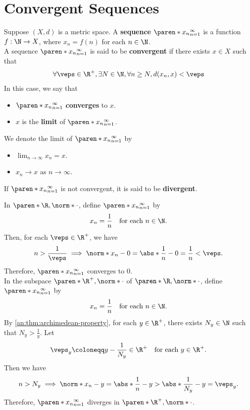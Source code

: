 \section{Convergent Sequences}

\begin{definition} \label{an:def:sequence-convergence}
  Suppose $(X, d)$ is a metric space. A \textbf{sequence} $\paren*{x_{n}}_{n = 1}^{\infty}$
  is a function $f: \N \to X$, where $x_{n} = f(n)$ for each $n \in \N$.
  \\[6mm]
  A sequence $\paren*{x_{n}}_{n = 1}^{\infty}$ is said to be \textbf{convergent} if there exists $x \in X$ such that
  \[
    \forall \veps \in \R^{+}, \exists N \in \N, \forall n \geq N, d(x_{n}, x) < \veps
  \]
  In this case, we say that
  \begin{itemize}
    \item $\paren*{x_{n}}_{n = 1}^{\infty}$ \textbf{converges} to $x$.
    \item $x$ is the \textbf{limit} of $\paren*{x_{n}}_{n = 1}^{\infty}$.
  \end{itemize}
  We denote the limit of $\paren*{x_{n}}_{n = 1}^{\infty}$ by
  \begin{itemize}
    \item $\lim_{n \to \infty} x_{n} = x$.
    \item $x_{n} \to x$ as $n \to \infty$.
  \end{itemize}
  If $\paren*{x_{n}}_{n = 1}^{\infty}$ is not convergent, it is said to be \textbf{divergent}.

\end{definition}

\bigskip

\begin{example}
  In $\paren*{\R, \norm*{\cdot}}$, define $\paren*{x_{n}}_{n = 1}^{\infty}$ by
  \[
    x_{n} = \frac{1}{n} \quad \text{for each } n \in \N.
  \]
  Then, for each $\veps \in \R^{+}$, we have
  \[
    n > \frac{1}{\veps} \implies \norm*{x_{n} - 0} = \abs*{\frac{1}{n} - 0} = \frac{1}{n} < \veps.
  \]
  Therefore, $\paren*{x_{n}}_{n = 1}^{\infty}$ converges to $0$.
  \\[6mm]
  In the subspace $\paren*{\R^{+}, \norm*{\cdot}}$ of $\paren*{\R, \norm*{\cdot}}$, define
  $\paren*{x_{n}}_{n = 1}^{\infty}$ by
  \[
    x_{n} = \frac{1}{n} \quad \text{for each } n \in \N.
  \]
  By \cref{an:thm:archimedean-property}, for each $y \in \R^{+}$, there exists $N_{y} \in \N$ such that $N_{y} >
    \frac{1}{y}$. Let
  \[
    \veps_{y} \coloneqq y - \frac{1}{N_{y}} \in \R^{+} \quad \text{for each } y \in \R^{+}.
  \]
  Then we have
  \[
    n > N_{y} \implies \norm*{x_{n} - y} = \abs*{\frac{1}{n} - y} > \abs*{\frac{1}{N_{y}} - y} = \veps_{y}.
  \]
  Therefore, $\paren*{x_{n}}_{n = 1}^{\infty}$ diverges in $\paren*{\R^{+}, \norm*{\cdot}}$.
\end{example}

